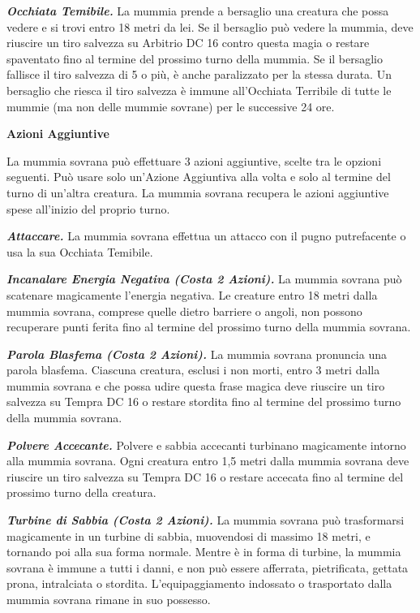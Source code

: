 \begin{multicols}{2}
\emph{\textbf{Occhiata Temibile.}} La mummia prende a bersaglio una
creatura che possa vedere e si trovi entro 18 metri da lei. Se il
bersaglio può vedere la mummia, deve riuscire un tiro salvezza su Arbitrio DC 16 contro questa magia o restare spaventato fino al termine
del prossimo turno della mummia. Se il bersaglio fallisce il tiro
salvezza di 5 o più, è anche paralizzato per la stessa durata. Un
bersaglio che riesca il tiro salvezza è immune all'Occhiata Terribile di
tutte le mummie (ma non delle mummie sovrane) per le successive 24 ore.

\textbf{Azioni Aggiuntive}

La mummia sovrana può effettuare 3 azioni aggiuntive, scelte tra le
opzioni seguenti. Può usare solo un'Azione Aggiuntiva alla volta e
solo al termine del turno di un'altra creatura. La mummia sovrana
recupera le azioni aggiuntive spese all'inizio del proprio turno.

\emph{\textbf{Attaccare.}} La mummia sovrana effettua un attacco con il
pugno putrefacente o usa la sua Occhiata Temibile.

\emph{\textbf{Incanalare Energia Negativa (Costa 2 Azioni).}} La mummia
sovrana può scatenare magicamente l'energia negativa. Le creature entro
18 metri dalla mummia sovrana, comprese quelle dietro barriere o angoli,
non possono recuperare punti ferita fino al termine del prossimo turno
della mummia sovrana.

\emph{\textbf{Parola Blasfema (Costa 2 Azioni).}} La mummia sovrana
pronuncia una parola blasfema. Ciascuna creatura, esclusi i non morti,
entro 3 metri dalla mummia sovrana e che possa udire questa frase magica
deve riuscire un tiro salvezza su Tempra DC 16 o restare stordita
fino al termine del prossimo turno della mummia sovrana.

\emph{\textbf{Polvere Accecante.}} Polvere e sabbia accecanti turbinano
magicamente intorno alla mummia sovrana. Ogni creatura entro 1,5 metri
dalla mummia sovrana deve riuscire un tiro salvezza su Tempra DC
16 o restare accecata fino al termine del prossimo turno della creatura.

\emph{\textbf{Turbine di Sabbia (Costa 2 Azioni).}} La mummia sovrana
può trasformarsi magicamente in un turbine di sabbia, muovendosi di
massimo 18 metri, e tornando poi alla sua forma normale. Mentre è in
forma di turbine, la mummia sovrana è immune a tutti i danni, e non può
essere afferrata, pietrificata, gettata prona, intralciata o stordita.
L'equipaggiamento indossato o trasportato dalla mummia sovrana rimane in
suo possesso.




\end{multicols}
